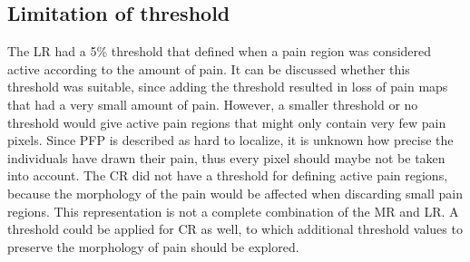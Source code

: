 \subsection{Limitation of threshold}
The LR had a 5\% threshold that defined when a pain region was considered active according to the amount of pain. It can be discussed whether this threshold was suitable, since adding the threshold resulted in loss of pain maps that had a very small amount of pain. However, a smaller threshold or no threshold would give active pain regions that might only contain very few pain pixels. Since PFP is described as hard to localize, it is unknown how precise the individuals have drawn their pain, thus every pixel should maybe not be taken into account.
The CR did not have a threshold for defining active pain regions, because the morphology of the pain would be affected when discarding small pain regions. This representation is not a complete combination of the MR and LR. A threshold could be applied for CR as well, to which additional threshold values to preserve the morphology of pain should be explored. 

